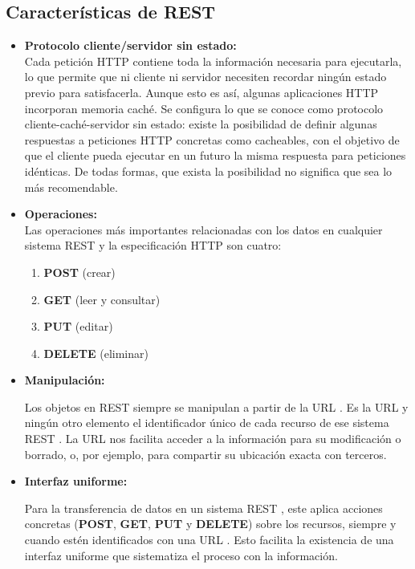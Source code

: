 \documentclass[10pt]{article}
\newcommand{\rest}[1]{{\textcolor{Mag}{REST} #1}}
\newcommand{\http}[1]{{\textcolor{B}{HTTP} #1}}
\newcommand{\enlaces}[1]{{\textcolor{G}{URL} #1}}
\begin{document}
\subsection{Características de \rest{}}
\begin{itemize}
\item  \textbf{Protocolo cliente/servidor sin estado:}\\
Cada petición \http{} contiene toda la información necesaria para ejecutarla, lo que permite que ni cliente ni servidor necesiten recordar ningún estado previo para satisfacerla. Aunque esto es así, algunas aplicaciones \http{} incorporan memoria caché. Se configura lo que se conoce como protocolo cliente-caché-servidor sin estado: existe la posibilidad de definir algunas respuestas a peticiones \http{} concretas como cacheables, con el objetivo de que el cliente pueda ejecutar en un futuro la misma respuesta para peticiones idénticas. De todas formas, que exista la posibilidad no significa que sea lo más recomendable.

\item \textbf{Operaciones:}\\
Las operaciones más importantes relacionadas con los datos en cualquier sistema \rest{} y la especificación \http{} son cuatro: 
	\begin{enumerate}
		\item \textbf{POST} (crear)
		\item \textbf{GET} (leer y consultar)
		\item \textbf{PUT} (editar) 
		\item \textbf{DELETE} (eliminar)
	\end{enumerate}

\item \textbf{Manipulación:}

 Los objetos en \rest siempre se manipulan a partir de la \enlaces{}. Es la \enlaces{} y ningún otro elemento el identificador único de cada recurso de ese sistema \rest. La \enlaces{} nos facilita acceder a la información para su modificación o borrado, o, por ejemplo, para compartir su ubicación exacta con terceros. 

\item  \textbf{Interfaz uniforme:}
 
Para la transferencia de datos en un sistema \rest{}, este aplica acciones concretas (\textbf{POST}, \textbf{GET}, \textbf{PUT} y \textbf{DELETE}) sobre los recursos, siempre y cuando estén identificados con una \enlaces{}. Esto facilita la existencia de una interfaz uniforme que sistematiza el proceso con la información.
\end{itemize}
\end{document}
